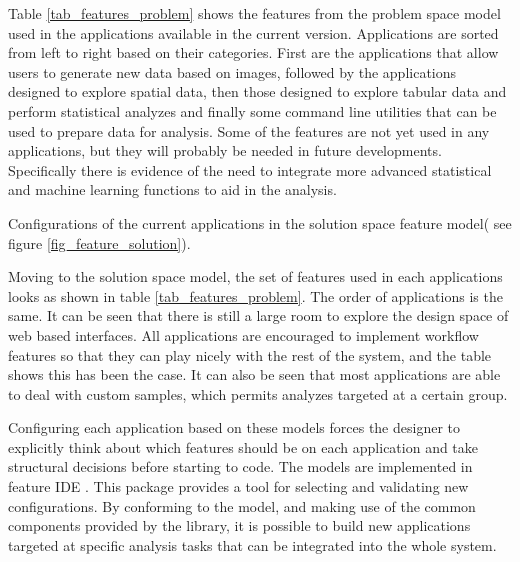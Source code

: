 Table \ref{tab_features_problem} shows the features from the problem space model used in the applications available in the current version. Applications are sorted from left to right based on their categories. First are the applications that allow users to generate new data based on images, followed by the applications designed to explore spatial data, then those designed to explore tabular data and perform statistical analyzes and finally some command line utilities that can be used to prepare data for analysis. Some of the features are not yet used in any applications, but they will probably be needed in future developments. Specifically there is evidence of the need to integrate more advanced statistical and machine learning functions to aid in the analysis. 

\begin{table}
\scriptsize
	
\caption{ \label{tab_features_solution} Configurations of the current applications in the solution space feature model( see figure \ref{fig_feature_solution}).}
\end{table}


Moving to the solution space model, the set of features used in each applications looks as shown in table \ref{tab_features_problem}. The order of applications is the same. It can be seen that there is still a large room to explore the design space of web based interfaces. All applications are encouraged to implement workflow features so that they can play nicely with the rest of the system, and the table shows this has been the case. It can also be seen that most applications are able to deal with custom samples, which permits analyzes targeted at a certain group.

Configuring each application based on these models forces the designer to explicitly think about which features should be on each application and take structural decisions before starting to code. The models are implemented in feature IDE \autocite{thum_featureide:_2014}. This package provides a tool for selecting and validating new configurations. By conforming to the model, and making use of the common components provided by the library, it is possible to build new applications targeted at specific analysis tasks that can be integrated into the whole system.




